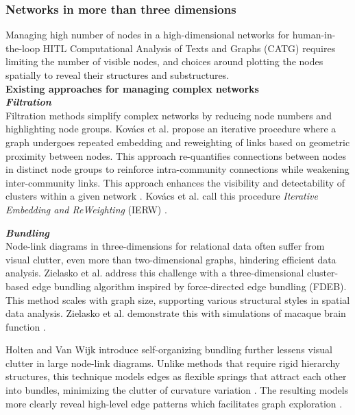 \subsubsection{Networks in more than three dimensions}
Managing high number of nodes in a high-dimensional networks for human-in-the-loop HITL Computational Analysis of Texts and Graphs (CATG) requires limiting the number of visible nodes, and choices around plotting the nodes spatially to reveal their structures and substructures.\\
\noindent \textbf{Existing approaches for managing complex networks} \\
\noindent \textbf{\textit{Filtration}} \\
Filtration methods simplify complex networks by reducing node numbers and highlighting node groups. Kovács et al. propose an iterative procedure where a graph undergoes repeated embedding and reweighting of links based on geometric proximity between nodes. This approach re-quantifies connections between nodes in distinct node groups to reinforce intra-community connections while weakening inter-community links. This approach enhances the visibility and detectability of clusters within a given network \citep[p. 1]{kovacs_iterative_2024}. Kovács et al. call this procedure \textit{Iterative Embedding and ReWeighting} (IERW) \citep[p. 2]{kovacs_iterative_2024}.

\noindent \textbf{\textit{Bundling}} \\
Node-link diagrams in three-dimensions for relational data often suffer from visual clutter, even more than two-dimensional graphs, hindering efficient data analysis. Zielasko et al. address this challenge with a three-dimensional cluster-based edge bundling algorithm inspired by force-directed edge bundling (FDEB). This method scales with graph size, supporting various structural styles in spatial data analysis. Zielasko et al. demonstrate this with simulations of macaque brain function \citep[p. 1]{zielasko_interactive_2016}.

Holten and Van Wijk introduce self-organizing bundling further lessens visual clutter in large node-link diagrams. Unlike methods that require rigid hierarchy structures, this technique models edges as flexible springs that attract each other into bundles, minimizing the clutter of curvature variation \citep{holten_forcedirected_2009}. The resulting models more clearly reveal high-level edge patterns which facilitates graph exploration \citep[p. 1]{holten_forcedirected_2009}.

